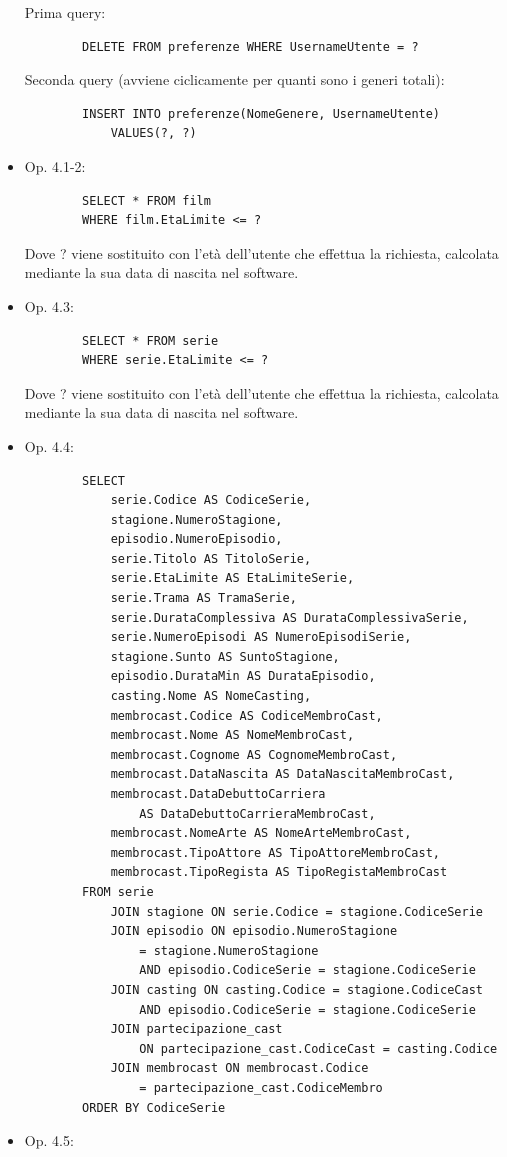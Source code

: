 \documentclass[a4paper,12pt]{report}
\begin{document}
\begin{itemize}
	Prima query:
	\begin{verbatim}
		DELETE FROM preferenze WHERE UsernameUtente = ?
	\end{verbatim}
	Seconda query (avviene ciclicamente per quanti sono i generi totali):
	\begin{verbatim}
		INSERT INTO preferenze(NomeGenere, UsernameUtente)
			VALUES(?, ?)
	\end{verbatim}
	\item Op. 4.1-2:
	\begin{verbatim}
		SELECT * FROM film
		WHERE film.EtaLimite <= ?
	\end{verbatim}
	Dove ? viene sostituito con l'età dell'utente che effettua la richiesta, calcolata mediante la sua data di nascita nel software.
	\item Op. 4.3:
	\begin{verbatim}
		SELECT * FROM serie
		WHERE serie.EtaLimite <= ?
	\end{verbatim}
	Dove ? viene sostituito con l'età dell'utente che effettua la richiesta, calcolata mediante la sua data di nascita nel software.
	\item Op. 4.4:
	\begin{verbatim}
		SELECT 
			serie.Codice AS CodiceSerie,
			stagione.NumeroStagione,
			episodio.NumeroEpisodio,
			serie.Titolo AS TitoloSerie,
			serie.EtaLimite AS EtaLimiteSerie,
			serie.Trama AS TramaSerie,
			serie.DurataComplessiva AS DurataComplessivaSerie,
			serie.NumeroEpisodi AS NumeroEpisodiSerie,
			stagione.Sunto AS SuntoStagione,
			episodio.DurataMin AS DurataEpisodio,
			casting.Nome AS NomeCasting,
			membrocast.Codice AS CodiceMembroCast,
			membrocast.Nome AS NomeMembroCast,
			membrocast.Cognome AS CognomeMembroCast,
			membrocast.DataNascita AS DataNascitaMembroCast,
			membrocast.DataDebuttoCarriera 
				AS DataDebuttoCarrieraMembroCast,
			membrocast.NomeArte AS NomeArteMembroCast,
			membrocast.TipoAttore AS TipoAttoreMembroCast,
			membrocast.TipoRegista AS TipoRegistaMembroCast
		FROM serie
			JOIN stagione ON serie.Codice = stagione.CodiceSerie
			JOIN episodio ON episodio.NumeroStagione 
				= stagione.NumeroStagione
				AND episodio.CodiceSerie = stagione.CodiceSerie
			JOIN casting ON casting.Codice = stagione.CodiceCast
				AND episodio.CodiceSerie = stagione.CodiceSerie 
			JOIN partecipazione_cast 
				ON partecipazione_cast.CodiceCast = casting.Codice
			JOIN membrocast ON membrocast.Codice 
				= partecipazione_cast.CodiceMembro
		ORDER BY CodiceSerie
	\end{verbatim}
	\item Op. 4.5: 

\end{itemize}
\end{document}
